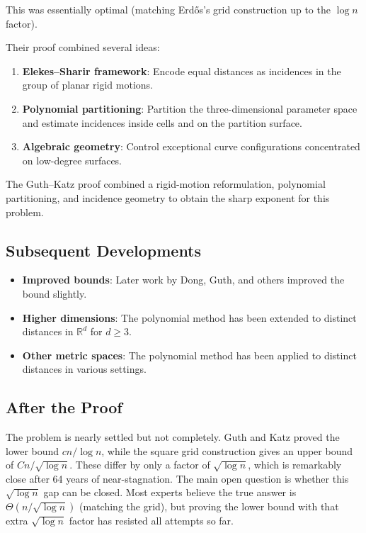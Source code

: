 This was essentially optimal (matching Erd\H{o}s's grid construction up to the $\log n$ factor).

Their proof combined several ideas:

\begin{enumerate}
\item \textbf{Elekes--Sharir framework}: Encode equal distances as incidences in the group of planar rigid motions.
\item \textbf{Polynomial partitioning}: Partition the three-dimensional parameter space and estimate incidences inside cells and on the partition surface.
\item \textbf{Algebraic geometry}: Control exceptional curve configurations concentrated on low-degree surfaces.
\end{enumerate}

\begin{highlightbox}
The Guth--Katz proof combined a rigid-motion reformulation, polynomial partitioning, and incidence geometry to obtain the sharp exponent for this problem.
\end{highlightbox}

\subsection{Subsequent Developments}

\begin{itemize}
\item \textbf{Improved bounds}: Later work by Dong, Guth, and others improved the bound slightly.
\item \textbf{Higher dimensions}: The polynomial method has been extended to distinct distances in $\mathbb{R}^d$ for $d \geq 3$.
\item \textbf{Other metric spaces}: The polynomial method has been applied to distinct distances in various settings.
\end{itemize}

\subsection{After the Proof}

The problem is nearly settled but not completely. Guth and Katz proved the lower bound $cn / \log n$, while the square grid construction gives an upper bound of $Cn / \sqrt{\log n}$. These differ by only a factor of $\sqrt{\log n}$, which is remarkably close after 64 years of near-stagnation. The main open question is whether this $\sqrt{\log n}$ gap can be closed. Most experts believe the true answer is $\Theta(n / \sqrt{\log n})$ (matching the grid), but proving the lower bound with that extra $\sqrt{\log n}$ factor has resisted all attempts so far.

